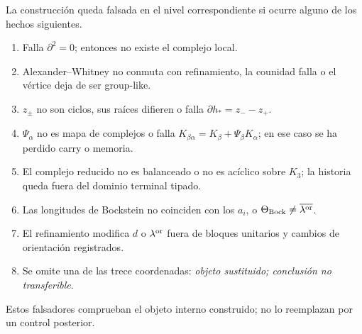\begin{ablation}
\label{abl:detint-falsadores}
La construcción queda falsada en el nivel correspondiente si ocurre alguno
de los hechos siguientes.
\begin{enumerate}
 \item Falla \(\partial^2=0\); entonces no existe el complejo local.
 \item Alexander--Whitney no conmuta con refinamiento, la counidad falla o
 el vértice deja de ser group-like.
 \item \(z_\pm\) no son ciclos, sus raíces difieren o falla
 \(\partial h_*=z_--z_+\).
 \item \(\Psi_\alpha\) no es mapa de complejos o falla
 \(K_{\beta\alpha}=K_\beta+\Psi_\beta K_\alpha\); en ese caso se ha
 perdido carry o memoria.
 \item El complejo reducido no es balanceado o no es acíclico sobre
 \(K_3\); la historia queda fuera del dominio terminal tipado.
 \item Las longitudes de Bockstein no coinciden con los \(a_i\), o
 \(\Theta_{\rm Bock}\ne\overline{\lambda^{\rm or}}\).
 \item El refinamiento modifica \(d\) o \(\lambda^{\rm or}\) fuera de
 bloques unitarios y cambios de orientación registrados.
 \item Se omite una de las trece coordenadas: \emph{objeto sustituido;
 conclusión no transferible}.
\end{enumerate}
Estos falsadores comprueban el objeto interno construido; no lo reemplazan
por un control posterior.
\end{ablation}
\fi
